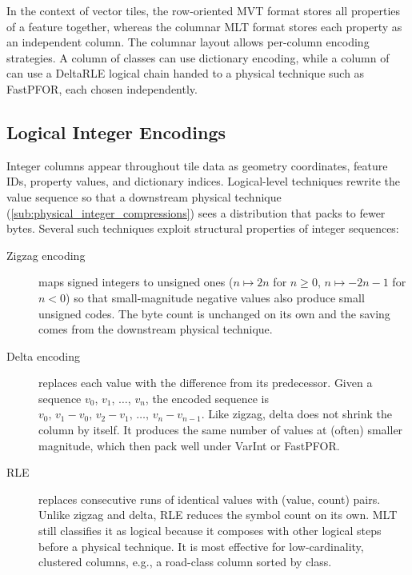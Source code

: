 In the context of vector tiles, the row-oriented \ac{MVT} format stores all properties of a feature together, whereas the columnar \ac{MLT} format stores each property as an independent column.
The columnar layout allows per-column encoding strategies.
A column of  classes can use dictionary encoding, while a column of  can use a DeltaRLE logical chain handed to a physical technique such as FastPFOR, each chosen independently.

\subsection{Logical Integer Encodings}\label{sub:logical_integer_encodings}

Integer columns appear throughout tile data as geometry coordinates, feature IDs, property values, and dictionary indices.
Logical-level techniques rewrite the value sequence so that a downstream physical technique (\cref{sub:physical_integer_compressions}) sees a distribution that packs to fewer bytes.
Several such techniques exploit structural properties of integer sequences:

\begin{description}
    \item[Zigzag encoding] maps signed integers to unsigned ones ($n \mapsto 2n$ for $n \geq 0$, $n \mapsto -2n-1$ for $n < 0$) so that small-magnitude negative values also produce small unsigned codes.
    The byte count is unchanged on its own and the saving comes from the downstream physical technique.

    \item[Delta encoding] replaces each value with the difference from its predecessor.
    Given a sequence $v_0$, $v_1$, $\ldots$, $v_n$, the encoded sequence is $v_0,\, v_1 - v_0,\, v_2 - v_1,\, \ldots,\, v_n - v_{n-1}$.
    Like zigzag, delta does not shrink the column by itself.
    It produces the same number of values at (often) smaller magnitude, which then pack well under VarInt or FastPFOR.

    \item[\acf{RLE}] replaces consecutive runs of identical values with (value, count) pairs.
    Unlike zigzag and delta, RLE reduces the symbol count on its own.
    MLT still classifies it as logical because it composes with other logical steps before a physical technique.
    It is most effective for low-cardinality, clustered columns, e.g., a road-class column sorted by class.
\end{description}

